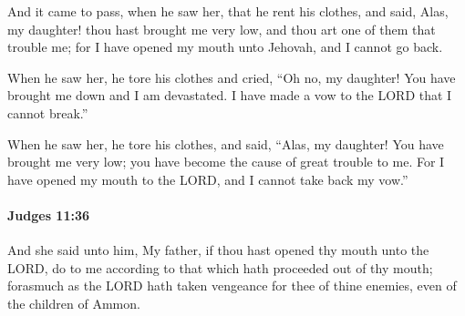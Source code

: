 			\begin{versebox}
					\item[BHS] 
					\item[ASV] And it came to pass, when he saw her, that he rent his clothes, and said, Alas, my daughter! thou hast brought me very low, and thou art one of them that trouble me; for I have opened my mouth unto Jehovah, and I cannot go back.
					\item[NIV] When he saw her, he tore his clothes and cried, “Oh no, my daughter! You have brought me down and I am devastated. I have made a vow to the LORD that I cannot break.”
					\item[NRSV] When he saw her, he tore his clothes, and said, “Alas, my daughter! You have brought me very low; you have become the cause of great trouble to me. For I have opened my mouth to the LORD, and I cannot take back my vow.”
			\end{versebox}

		\paragraph{Judges 11:36} %
			\label{JUDGES-11-36}

			And she said unto him, My father, if thou hast opened thy mouth unto the LORD, do to me according to that which hath proceeded out of thy mouth; forasmuch as the LORD hath taken vengeance for thee of thine enemies, even of the children of Ammon.

